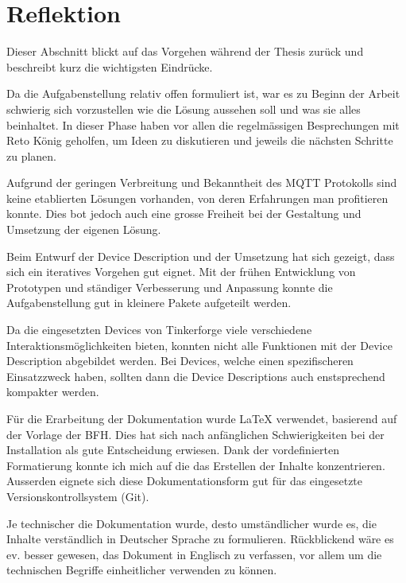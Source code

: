 \section{Reflektion}

Dieser Abschnitt blickt auf das Vorgehen während der Thesis zurück und beschreibt kurz die wichtigsten Eindrücke.

Da die Aufgabenstellung relativ offen formuliert ist, war es zu Beginn der Arbeit schwierig sich vorzustellen wie die Lösung aussehen soll und was sie alles beinhaltet. In dieser Phase haben vor allen die regelmässigen Besprechungen mit Reto König geholfen, um Ideen zu diskutieren und jeweils die nächsten Schritte zu planen.

Aufgrund der geringen Verbreitung und Bekanntheit des MQTT Protokolls sind keine etablierten Lösungen vorhanden, von deren Erfahrungen man profitieren konnte. Dies bot jedoch auch eine grosse Freiheit bei der Gestaltung und Umsetzung der eigenen Lösung.

Beim Entwurf der Device Description und der Umsetzung hat sich gezeigt, dass sich ein iteratives Vorgehen   gut eignet. Mit der frühen Entwicklung von Prototypen und ständiger Verbesserung und Anpassung konnte die Aufgabenstellung gut in kleinere Pakete aufgeteilt werden.

Da die eingesetzten Devices von Tinkerforge viele verschiedene Interaktionsmöglichkeiten bieten, konnten nicht alle Funktionen mit der Device Description abgebildet werden. Bei Devices, welche einen spezifischeren Einsatzzweck haben, sollten dann die Device Descriptions auch enstsprechend kompakter werden.


Für die Erarbeitung der Dokumentation wurde LaTeX verwendet, basierend auf der Vorlage der BFH. Dies hat sich nach anfänglichen Schwierigkeiten bei der Installation als gute Entscheidung erwiesen. Dank der vordefinierten Formatierung konnte ich mich auf die das Erstellen der Inhalte konzentrieren. Ausserden eignete sich diese Dokumentationsform gut für das eingesetzte Versionskontrollsystem (Git).

Je technischer die Dokumentation wurde, desto umständlicher wurde es, die Inhalte verständlich in Deutscher Sprache zu formulieren. Rückblickend wäre es ev. besser gewesen, das Dokument in Englisch zu verfassen, vor allem um die technischen Begriffe einheitlicher verwenden zu können.
